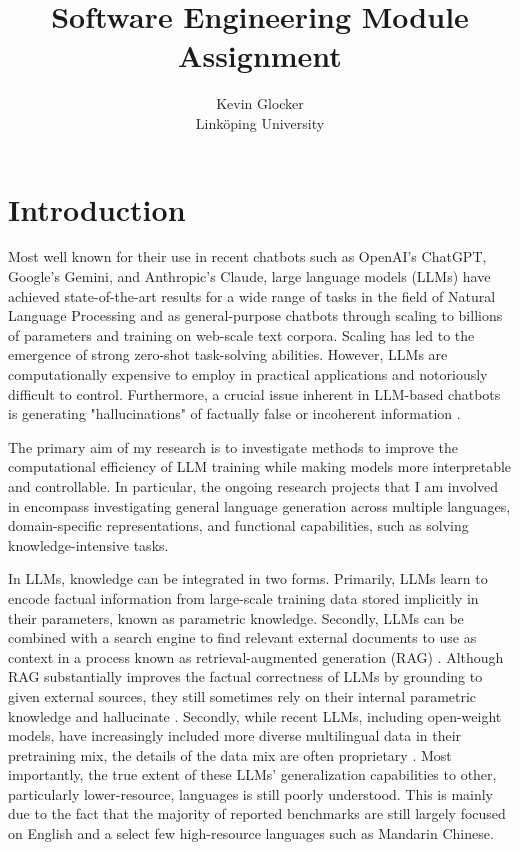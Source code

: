 \documentclass[11pt]{article}
\title{Software Engineering Module Assignment}
\author{Kevin Glocker\\Linköping University}
\date{}
\begin{document}
\maketitle

\section{Introduction}

Most well known for their use in recent chatbots such as OpenAI's ChatGPT, Google's Gemini, and Anthropic's Claude, large language models (LLMs) have achieved state-of-the-art results for a wide range of tasks in the field of Natural Language Processing and as general-purpose chatbots through scaling to billions of parameters and training on web-scale text corpora. Scaling has led to the emergence of strong zero-shot task-solving abilities. However, LLMs are computationally expensive to employ in practical applications and notoriously difficult to control. Furthermore, a crucial issue inherent in LLM-based chatbots is generating "hallucinations" of factually false or incoherent information \parencite{xu2024hallucination}.

The primary aim of my research is to investigate methods to improve the computational efficiency of LLM training while making models more interpretable and controllable. In particular, the ongoing research projects that I am involved in encompass investigating general language generation across multiple languages, domain-specific representations, and functional capabilities, such as solving knowledge-intensive tasks.

In LLMs, knowledge can be integrated in two forms. Primarily, LLMs learn to encode factual information from large-scale training data stored implicitly in their parameters, known as parametric knowledge. Secondly, LLMs can be combined with a search engine to find relevant external documents to use as context in a process known as retrieval-augmented generation (RAG) \parencite{lewis2020retrieval}. Although RAG substantially improves the factual correctness of LLMs by grounding to given external sources, they still sometimes rely on their internal parametric knowledge and hallucinate \parencites{zhao2024steering, 11029995}.
Secondly, while recent LLMs, including open-weight models, have increasingly included more diverse multilingual data in their pretraining mix, the details of the data mix are often proprietary \parencites{team2025gemma, yang2025qwen3}. Most importantly, the true extent of these LLMs' generalization capabilities to other, particularly lower-resource, languages is still poorly understood. This is mainly due to the fact that the majority of reported benchmarks are still largely focused on English and a select few high-resource languages such as Mandarin Chinese.
\end{document}
